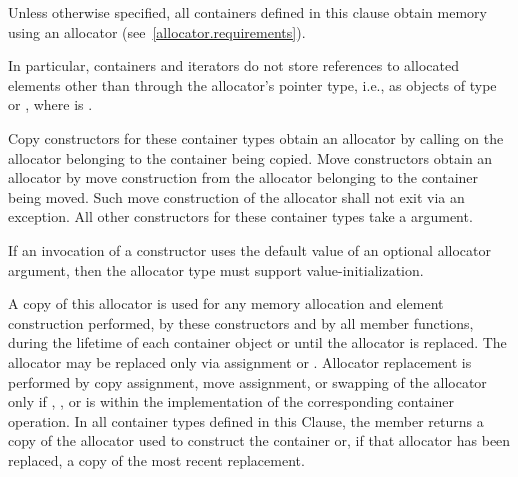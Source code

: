 \pnum
Unless otherwise specified, all containers defined in this clause obtain memory
using an allocator (see~\ref{allocator.requirements}).
\begin{note} In particular, containers and iterators do not store references
to allocated elements other than through the allocator's pointer type,
i.e., as objects of type  or
,
where  is . \end{note}
Copy constructors for these container types obtain an allocator by calling
on the allocator belonging to the container being copied.
Move constructors obtain an allocator by move construction from the allocator belonging to
the container being moved. Such move construction of the allocator shall not exit via an
exception.
All other constructors for these container types take a
 argument.
\begin{note} If an invocation of a constructor uses the default value of an optional
allocator argument, then the allocator type must support value-initialization.
\end{note}
A copy of this allocator is used for any memory allocation and element construction
performed, by these constructors and by all member functions,
during the lifetime of each container object
or until the allocator is replaced. The allocator may be replaced only via assignment or
. Allocator replacement is performed by
copy assignment, move assignment, or swapping of the allocator only if
,
,
or  is 
within the implementation of the corresponding container operation.
In all container types defined in this Clause, the member 
returns a copy of the allocator used to construct the container or, if that allocator
has been replaced, a copy of the most recent replacement.

